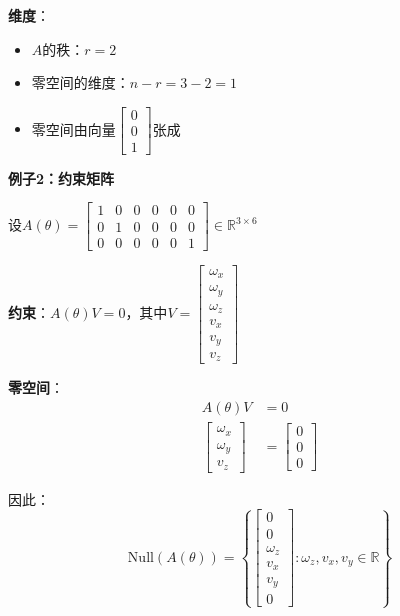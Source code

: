 \documentclass[12pt,a4paper]{article}
\begin{document}
\textbf{维度}：
\begin{itemize}
\item $A$的秩：$r = 2$
\item 零空间的维度：$n - r = 3 - 2 = 1$
\item 零空间由向量$\begin{bmatrix} 0 \\ 0 \\ 1 \end{bmatrix}$张成
\end{itemize}

\textbf{例子2：约束矩阵}

设$A(\theta) = \begin{bmatrix} 1 & 0 & 0 & 0 & 0 & 0 \\ 0 & 1 & 0 & 0 & 0 & 0 \\ 0 & 0 & 0 & 0 & 0 & 1 \end{bmatrix} \in \mathbb{R}^{3 \times 6}$

\textbf{约束}：$A(\theta)V = 0$，其中$V = \begin{bmatrix} \omega_x \\ \omega_y \\ \omega_z \\ v_x \\ v_y \\ v_z \end{bmatrix}$

\textbf{零空间}：
\begin{align}
A(\theta)V &= 0 \\
\begin{bmatrix} \omega_x \\ \omega_y \\ v_z \end{bmatrix} &= \begin{bmatrix} 0 \\ 0 \\ 0 \end{bmatrix}
\end{align}

因此：
\begin{equation}
\text{Null}(A(\theta)) = \left\{\begin{bmatrix} 0 \\ 0 \\ \omega_z \\ v_x \\ v_y \\ 0 \end{bmatrix} : \omega_z, v_x, v_y \in \mathbb{R}\right\}
\end{equation}
\end{document}
